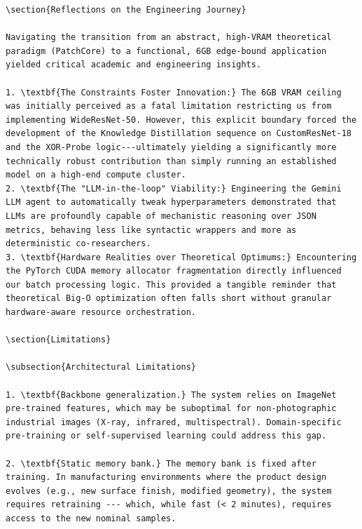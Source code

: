 \documentclass[12pt,a4paper,oneside]{report}
\begin{document}
\begin{verbatim}
\section{Reflections on the Engineering Journey}

Navigating the transition from an abstract, high-VRAM theoretical paradigm (PatchCore) to a functional, 6GB edge-bound application yielded critical academic and engineering insights.

1. \textbf{The Constraints Foster Innovation:} The 6GB VRAM ceiling was initially perceived as a fatal limitation restricting us from implementing WideResNet-50. However, this explicit boundary forced the development of the Knowledge Distillation sequence on CustomResNet-18 and the XOR-Probe logic---ultimately yielding a significantly more technically robust contribution than simply running an established model on a high-end compute cluster.
2. \textbf{The "LLM-in-the-loop" Viability:} Engineering the Gemini LLM agent to automatically tweak hyperparameters demonstrated that LLMs are profoundly capable of mechanistic reasoning over JSON metrics, behaving less like syntactic wrappers and more as deterministic co-researchers.
3. \textbf{Hardware Realities over Theoretical Optimums:} Encountering the PyTorch CUDA memory allocator fragmentation directly influenced our batch processing logic. This provided a tangible reminder that theoretical Big-O optimization often falls short without granular hardware-aware resource orchestration.

\section{Limitations}

\subsection{Architectural Limitations}

1. \textbf{Backbone generalization.} The system relies on ImageNet pre-trained features, which may be suboptimal for non-photographic industrial images (X-ray, infrared, multispectral). Domain-specific pre-training or self-supervised learning could address this gap.

2. \textbf{Static memory bank.} The memory bank is fixed after training. In manufacturing environments where the product design evolves (e.g., new surface finish, modified geometry), the system requires retraining --- which, while fast (< 2 minutes), requires access to the new nominal samples.


\end{verbatim}
\end{document}

